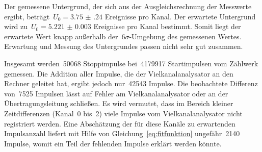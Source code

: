 Der gemessene Untergrund, der sich aus der Ausgleichsrechnung der Messwerte
ergibt, beträgt~$U_0=\num{3.75(24)}$ Ereignisse pro Kanal. Der erwartete
Untergrund wird zu~$U_0=\num{5.221(3)}$ Ereignisse pro Kanal bestimmt.
Somit liegt der erwartete Wert knapp außerhalb der~$6\sigma$-Umgebung des
gemessenen Wertes. Erwartung und Messung des Untergrundes passen nicht sehr gut
zusammen.

Insgesamt werden~\num{50068} Stoppimpulse bei~\num{4179917} Startimpulsen
vom Zählwerk gemessen. Die Addition aller Impulse, die der Vielkanalanalysator
an den Rechner geleitet hat, ergibt jedoch nur~\num{42543} Impulse. Die
beobachtete Differenz von~\num{7525} Impulsen lässt auf Fehler am
Vielkanalanalysator oder an der Übertragungsleitung schließen. Es wird vermutet,
dass im Bereich kleiner Zeitdifferenzen (Kanal~\num{0} bis~\num{2}) viele
Impulse vom Vielkanalanalysator nicht registriert werden. Eine Abschätzung der
für diese Kanäle zu erwartenden Impulsanzahl liefert mit Hilfe von
Gleichung~\eqref{eq:fitfunktion} ungefähr~\num{2140} Impulse, womit ein Teil
der fehlenden Impulse erklärt werden könnte.
